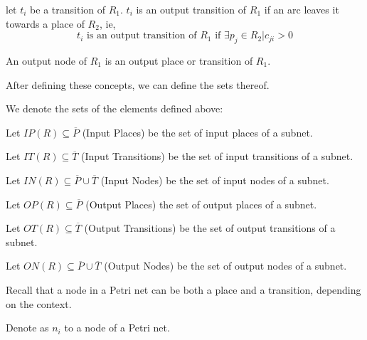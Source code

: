 {\begin{definition}
let $t_i$ be a transition of $R_1$. $t_i$ is an output transition of $R_1$ if an arc leaves it towards a place of $R_2$, ie,
\[
t_i \mbox{ is an output transition of } R_1 \mbox{ if } \exists p_j \in R_2 | c_{ji} > 0
\]
\end{definition}

\begin{definition}
An output node of $R_1$ is an output place or transition of $R_1$.
\end{definition}

After defining these concepts, we can define the sets thereof.

\begin{notation}
We denote the sets of the elements defined above:
 \begin{shortitemize}
  \item Let $IP(R) \subseteq  \overline P$ (Input Places) be the set of input  places of a subnet.
  \item Let $IT(R) \subseteq \overline T$ (Input Transitions) be the set of input transitions of a subnet.
  \item Let $IN(R) \subseteq \overline P \cup \overline T$ (Input Nodes)
        be the set of input nodes of a subnet.
  \item Let $OP(R) \subseteq  \overline P$ (Output Places) the set of output places of a subnet.
  \item Let $OT(R) \subseteq \overline T$ (Output Transitions) be the set of output transitions of a subnet.
  \item Let $ON(R) \subseteq \overline P \cup \overline T$ (Output Nodes)
        be the set of output nodes of a subnet.
\end{shortitemize}
\end{notation}

\begin{note}
Recall that a node in a Petri net can be both a place and a transition, depending on the context.
\end{note}
\begin{notation}
Denote as $ n_i $ to a node of a Petri net.
\end{notation}

}
